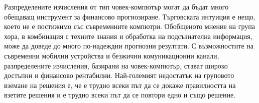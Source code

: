 Разпределените изчисления от тип човек-компютър могат да бъдат много обещаващ инструмент за финансово прогнозиране. Търговската интуиция е нещо, което не е постижимо със съвременните компютри. Обобщеното мнение на група хора, в комбинация с техните знания и обработка на подсъзнателна информация, може да доведе до много по-надеждни прогнозни резултати. С възможностите на съвременни мобилни устройства и безжични комуникационни канали, разпределените изчисления, базирани на човек-компютър, стават широко достъпни и финансово рентабилни. Най-големият недостатък на груповото вземане на решения е, че е трудно всеки път да се докаже правилността на взетите решения и е трудно всеки път да се повтори едно и също решение.

